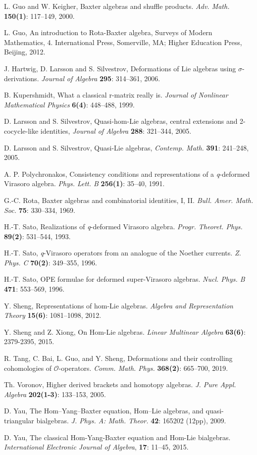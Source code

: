 \documentclass[a4paper,11pt]{amsart}
\theoremstyle{plain}
\theoremstyle{definition}
\theoremstyle{remark}
\numberwithin{equation}{section}
\begin{document}
\begin{thebibliography}{999}
L. Guo and W. Keigher, 
Baxter algebras and shuffle products.
\textit{ Adv. Math.} \textbf{150(1)}: 117--149, 2000.

L. Guo, An introduction to Rota-Baxter algebra, Surveys of Modern Mathematics, 4. International Press,
Somerville, MA; Higher Education Press, Beijing, 2012.


J. Hartwig, D. Larsson and S. Silvestrov,
Deformations of Lie algebras using $\sigma$-derivations.
\textit{Journal of Algebra} \textbf{295}: 314--361, 2006.

B. Kupershmidt,
What a classical r-matrix really is.
\textit{Journal of Nonlinear Mathematical Physics} \textbf{6(4)}: 448--488, 1999. 

D. Larsson and S. Silvestrov, Quasi-hom-Lie algebras, central extensions and 2-cocycle-like
identities, {\it Journal of Algebra} \textbf{288}: 321--344, 2005.

 D. Larsson and S. Silvestrov, Quasi-Lie algebras, {\it Contemp. Math.} \textbf{391}: 241--248, 2005.


A. P. Polychronakos,
 Consistency conditions and representations of a {\it q}-deformed Virasoro algebra. {\it Phys.
Lett. B} \textbf{256(1)}: 35--40, 1991.

G.-C. Rota, Baxter algebras and combinatorial identities, I, II.
\textit{ Bull. Amer. Math. Soc.} \textbf{75}: 330--334,  1969.

H.-T. Sato,
Realizations of {\it q}-deformed Virasoro algebra. {\it Progr. Theoret. Phys.} \textbf{89(2)}: 531--544, 1993.

H.-T. Sato,
{\it q}-Virasoro operators from an analogue of the Noether currents. {\it Z. Phys. C} \textbf{70(2)}: 349--355, 1996.

  H.-T. Sato, OPE formulae for deformed super-Virasoro algebras. {\it Nucl. Phys. B} \textbf{471}: 553--569, 1996.

Y. Sheng,
Representations of hom-Lie algebras.
\textit{Algebra and Representation Theory} \textbf{15(6)}: 1081--1098, 2012.

Y. Sheng and Z. Xiong,
On Hom-Lie algebras.
\textit{Linear Multinear Algebra} \textbf{63(6)}: 2379-2395, 2015.

R. Tang, C. Bai, L. Guo, and Y. Sheng,
Deformations and their controlling cohomologies of $\mathcal{O}$-operators.
\textit{Comm. Math. Phys.} \textbf{368(2)}: 665--700, 2019.

Th. Voronov, 
Higher derived brackets and homotopy algebras.
\textit{ J. Pure Appl. Algebra} \textbf{202(1-3)}:
133--153, 2005.

D. Yau,
The Hom–Yang–Baxter equation, Hom–Lie algebras,
and quasi-triangular bialgebras.
\textit{J. Phys. A: Math. Theor.} \textbf{42}: 165202 (12pp), 2009.

D. Yau,
The classical Hom-Yang-Baxter equation and
Hom-Lie bialgebras.
\textit{International Electronic Journal of Algebra}, \textbf{17}: 11--45, 2015.


\end{thebibliography}
\end{document}
